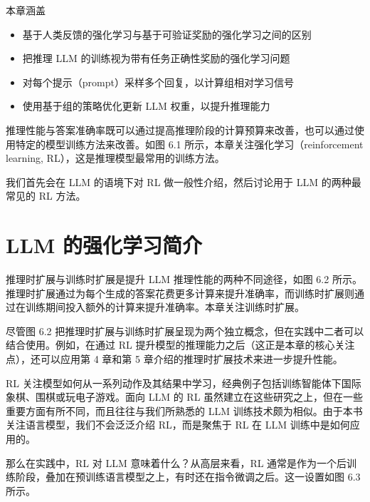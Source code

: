 \begin{myChapterIntro}{本章涵盖}
\begin{itemize}
\item 基于人类反馈的强化学习与基于可验证奖励的强化学习之间的区别
\item 把推理 LLM 的训练视为带有任务正确性奖励的强化学习问题
\item 对每个提示（prompt）采样多个回复，以计算组相对学习信号
\item 使用基于组的策略优化更新 LLM 权重，以提升推理能力
\end{itemize}
\end{myChapterIntro}

推理性能与答案准确率既可以通过提高推理阶段的计算预算来改善，也可以通过使用特定的模型训练方法来改善。如图 6.1 所示，本章关注强化学习（reinforcement learning, RL），这是推理模型最常用的训练方法。


我们首先会在 LLM 的语境下对 RL 做一般性介绍，然后讨论用于 LLM 的两种最常见的 RL 方法。

\section{LLM 的强化学习简介}

推理时扩展与训练时扩展是提升 LLM 推理性能的两种不同途径，如图 6.2 所示。推理时扩展通过为每个生成的答案花费更多计算来提升准确率，而训练时扩展则通过在训练期间投入额外的计算来提升准确率。本章关注训练时扩展。


尽管图 6.2 把推理时扩展与训练时扩展呈现为两个独立概念，但在实践中二者可以结合使用。例如，在通过 RL 提升模型的推理能力之后（这正是本章的核心关注点），还可以应用第 4 章和第 5 章介绍的推理时扩展技术来进一步提升性能。

RL 关注模型如何从一系列动作及其结果中学习，经典例子包括训练智能体下国际象棋、围棋或玩电子游戏。面向 LLM 的 RL 虽然建立在这些研究之上，但在一些重要方面有所不同，而且往往与我们所熟悉的 LLM 训练技术颇为相似。由于本书关注语言模型，我们不会泛泛介绍 RL，而是聚焦于 RL 在 LLM 训练中是如何应用的。

那么在实践中，RL 对 LLM 意味着什么？从高层来看，RL 通常是作为一个后训练阶段，叠加在预训练语言模型之上，有时还在指令微调之后。这一设置如图 6.3 所示。

